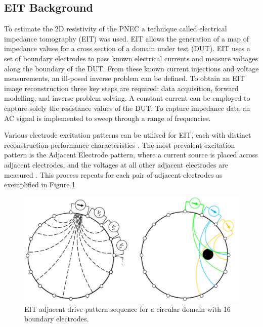 \subsection{EIT Background} \label{sec:Background}
To estimate the 2D resistivity of the PNEC a technique called electrical impedance tomography (EIT) was used. EIT allows the generation of a map of impedance values for a cross section of a domain under test (DUT). EIT uses a set of boundary electrodes to pass known electrical currents and measure voltages along the boundary of the DUT. From these known current injections and voltage measurements, an ill-posed inverse problem can be defined. To obtain an EIT image reconstruction three key steps are required: data acquisition, forward modelling, and inverse problem solving. A constant current can be employed to capture solely the resistance values of the DUT. To capture impedance data an AC signal is implemented to sweep through a range of frequencies. 

Various electrode excitation patterns can be utilised for EIT, each with distinct reconstruction performance characteristics \citep{Russo2017,Sherry2006,Brown1987}. The most prevalent excitation pattern is the Adjacent Electrode pattern, where a current source is placed across adjacent electrodes, and the voltages at all other adjacent electrodes are measured \citep{Adler2021}. This process repeats for each pair of adjacent electrodes as exemplified in Figure \ref{fig:EIT_adj_drive}
\begin{figure}[H]
	\centering
	\includegraphics[width=0.8\linewidth]{Figures/eit_sequence.png}
	\caption{EIT adjacent drive pattern sequence for a circular domain with 16 boundary electrodes.}
	\label{fig:EIT_adj_drive}
\end{figure}

